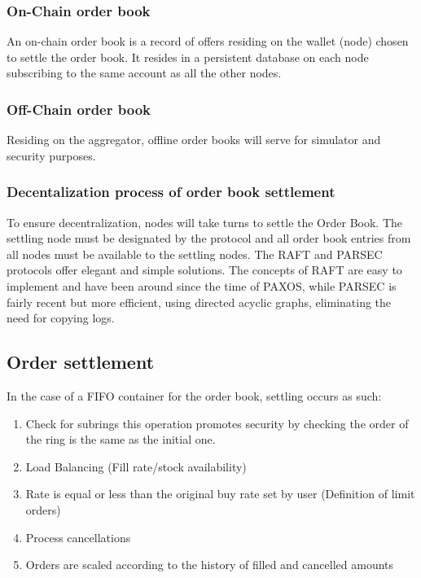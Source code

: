 \documentclass[]{article}
\begin{document}
\subsubsection{On-Chain order book}
An on-chain order book is a record of offers residing on the wallet (node) chosen to settle
the order book. It resides in a persistent database on each node subscribing 
to the same account as all the other nodes.

\subsubsection{Off-Chain order book}
Residing on the aggregator, offline order books will serve for simulator and security purposes.


\subsubsection{Decentalization process of order book settlement}
To ensure decentralization, nodes will take turns to settle the Order Book. 
The settling node must be designated by the protocol and all order book entries from all nodes must be available to the settling nodes. 
The RAFT\cite{18} and PARSEC\cite{23} protocols offer elegant and simple solutions. 
The concepts of RAFT are easy to implement and have been around since the time of PAXOS\cite{24}, 
while PARSEC is fairly recent but more efficient, using directed acyclic graphs, eliminating the need for copying logs.

\subsection{Order settlement}
In the case of a FIFO container for the order book,
settling occurs as such:
\begin{enumerate}
	\item Check for subrings
	this operation promotes security by checking the order of the ring is the same as the initial one.
	\item Load Balancing (Fill rate/stock availability)
	\item Rate is equal or less than the original buy rate set by user (Definition of limit orders)
	\item Process cancellations\\
	\item Orders are scaled according to the history of filled and cancelled amounts\\	 
\end{enumerate}	
	
\end{document}
